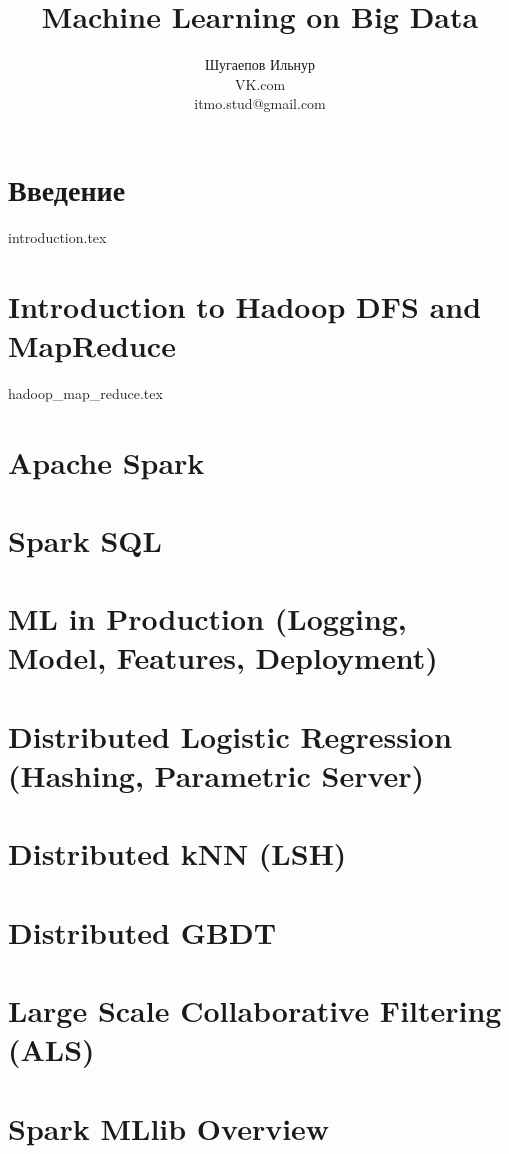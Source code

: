 \documentclass[12pt]{article}
\title{Machine Learning on Big Data}
\author{Шугаепов Ильнур 
\\
\small{VK.com} 
\\
\small{itmo.stud@gmail.com}}
\date{}
\numberwithin{equation}{section}
\begin{document}
\maketitle

\tableofcontents

\section*{Введение}
{introduction.tex}
 
\section{Introduction to Hadoop DFS and MapReduce}
{hadoop_map_reduce.tex}

\section{Apache Spark}

\section{Spark SQL}

\section{ML in Production (Logging, Model, Features, Deployment)}

\section{Distributed Logistic Regression (Hashing, Parametric Server)}

\section{Distributed kNN (LSH)}

\section{Distributed GBDT}

\section{Large Scale Collaborative Filtering (ALS)}

\section{Spark MLlib Overview}
\end{document}

